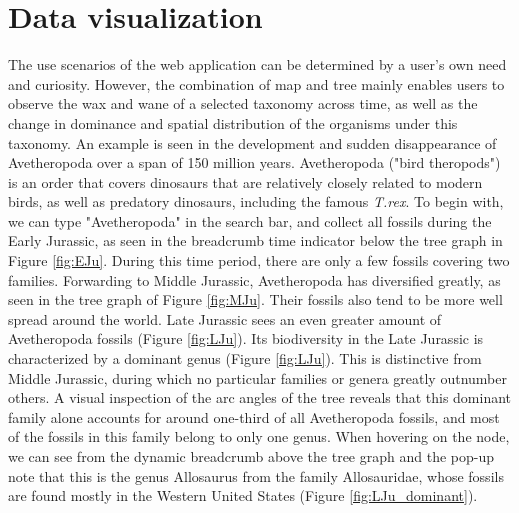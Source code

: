 \documentclass[11pt, a4paper,oneside,chapterprefix=false]{scrbook}
\begin{document}
\newpage
\section{Data visualization} \label{sec:result_data_visualization}
The use scenarios of the web application can be determined by a user's own need and curiosity. However, the combination of map and tree mainly enables users to observe the wax and wane of a selected taxonomy across time, as well as the change in dominance and spatial distribution of the organisms under this taxonomy. An example is seen in the development and sudden disappearance of Avetheropoda over a span of 150 million years. Avetheropoda ("bird theropods") is an order that covers dinosaurs that are relatively closely related to modern birds, as well as predatory dinosaurs, including the famous \emph{T.rex}. To begin with, we can type "Avetheropoda" in the search bar, and collect all fossils during the Early Jurassic, as seen in the breadcrumb time indicator below the tree graph in Figure \ref{fig:EJu}. During this time period, there are only a few fossils covering two families. Forwarding to Middle Jurassic, Avetheropoda has diversified greatly, as seen in the tree graph of Figure \ref{fig:MJu}. Their fossils also tend to be more well spread around the world. Late Jurassic sees an even greater amount of Avetheropoda fossils (Figure \ref{fig:LJu}). Its biodiversity in the Late Jurassic is characterized by a dominant genus (Figure \ref{fig:LJu}). This is distinctive from Middle Jurassic, during which no particular families or genera greatly outnumber others. A visual inspection of the arc angles of the tree reveals that this dominant family alone accounts for around one-third of all Avetheropoda fossils, and most of the fossils in this family belong to only one genus. When hovering on the node, we can see from the dynamic breadcrumb above the tree graph and the pop-up note that this is the genus Allosaurus from the family Allosauridae, whose fossils are found mostly in the Western United States (Figure \ref{fig:LJu_dominant}). \\
\end{document}
